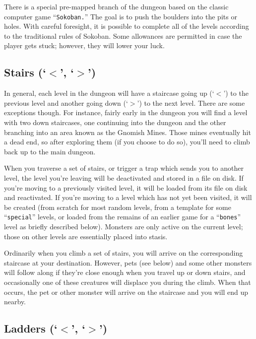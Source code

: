 There is a special pre-mapped branch of the dungeon based on the
classic computer game ``{\tt Sokoban.}''  The goal is to push the boulders
into the pits or holes.  With careful foresight, it is possible to
complete all of the levels according to the traditional rules of
Sokoban.  Some allowances are permitted in case the player gets stuck;
however, they will lower your luck.
\subsection*{Stairs (`{\tt $<$}', `{\tt $>$}')}


In general, each level in the dungeon will have a staircase going up
(`{\tt $<$}') to the previous level and another going down (`{\tt $>$}') to the next
level.  There are some exceptions though.  For instance, fairly early
in the dungeon you will find a level with two down staircases, one
continuing into the dungeon and the other branching into an area
known as the Gnomish Mines.  Those mines eventually hit a dead end,
so after exploring them (if you choose to do so), you'll need to
climb back up to the main dungeon.

When you traverse a set of stairs, or trigger a trap which sends you
to another level, the level you're leaving will be deactivated and
stored in a file on disk.  If you're moving to a previously visited
level, it will be loaded from its file on disk and reactivated.  If
you're moving to a level which has not yet been visited, it will be
created (from scratch for most random levels, from a template for
some ``{\tt special}'' levels, or loaded from the remains of an earlier game
for a ``{\tt bones}'' level as briefly described below).  Monsters are only
active on the current level; those on other levels are essentially
placed into stasis.

Ordinarily when you climb a set of stairs, you will arrive on the
corresponding staircase at your destination.  However, pets (see below)
and some other monsters will follow along if they're close enough when
you travel up or down stairs, and occasionally one of these creatures
will displace you during the climb.  When that occurs, the pet or other
monster will arrive on the staircase and you will end up nearby.
\subsection*{Ladders (`{\tt $<$}', `{\tt $>$}')}

